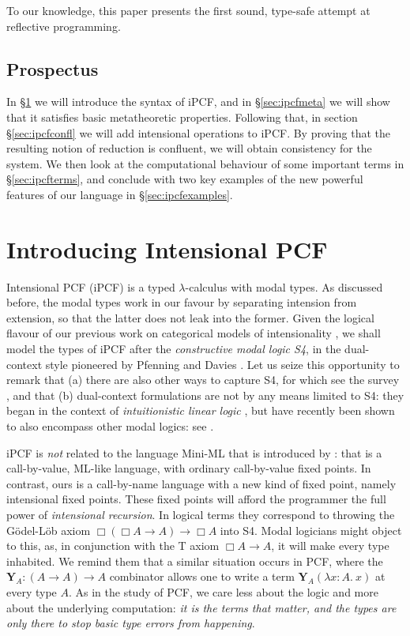 \documentclass{myifcolog}
\theoremstyle{definition}
\begin{document}
To our knowledge, this paper presents the first sound, type-safe
attempt at reflective programming.

\subsection{Prospectus}

In \S\ref{sec:ipcfintro} we will introduce the syntax of iPCF, and
in \S\ref{sec:ipcfmeta} we will show that it satisfies basic
metatheoretic properties. Following that, in section
\S\ref{sec:ipcfconfl} we will add intensional operations to iPCF.
By proving that the resulting notion of reduction is confluent, we
will obtain consistency for the system. We then look at the
computational behaviour of some important terms in
\S\ref{sec:ipcfterms}, and conclude with two key examples of the
new powerful features of our language in \S\ref{sec:ipcfexamples}.


\section{Introducing Intensional PCF}
  \label{sec:ipcfintro}

Intensional PCF (iPCF) is a typed $\lambda$-calculus with modal
types. As discussed before, the modal types work in our favour by
separating intension from extension, so that the latter does not
leak into the former. Given the logical flavour of our previous
work on categorical models of intensionality \cite{Kavvos2017a},
we shall model the types of iPCF after the \emph{constructive
modal logic \textsf{S4}}, in the dual-context style pioneered by
Pfenning and Davies \cite{Davies2001,Davies2001a}. Let us seize
this opportunity to remark that (a) there are also other ways to
capture \textsf{S4}, for which see the survey \cite{Kavvos2016b},
and that (b) dual-context formulations are not by any means
limited to \textsf{S4}: they began in the context of
\emph{intuitionistic linear logic} \cite{Barber1996}, but have
recently been shown to also encompass other modal logics: see
\cite{Kavvos2017b}.

iPCF is \emph{not} related to the language \textsf{Mini-ML} that
is introduced by \cite{Davies2001a}: that is a call-by-value,
ML-like language, with ordinary call-by-value fixed points. In
contrast, ours is a call-by-name language with a new kind of fixed
point, namely intensional fixed points. These fixed points will
afford the programmer the full power of \emph{intensional
recursion}.  In logical terms they correspond to throwing the
G\"odel-L\"ob axiom $\Box(\Box A \rightarrow A) \rightarrow \Box
A$ into \textsf{S4}. Modal logicians might object to this, as, in
conjunction with the \textsf{T} axiom $\Box A \rightarrow A$, it
will make every type inhabited. We remind them that a similar
situation occurs in PCF, where the $\mathbf{Y}_A : (A \rightarrow
A) \rightarrow A$ combinator allows one to write a term
$\mathbf{Y}_A(\lambda x : A.\ x)$ at every type $A$. As in the
study of PCF, we care less about the logic and more about the
underlying computation: \emph{it is the terms that matter, and the
types are only there to stop basic type errors from happening}.
\end{document}
